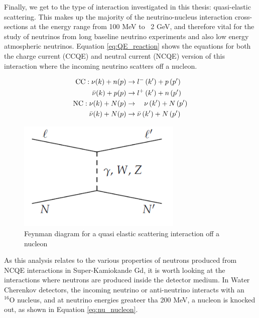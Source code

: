 Finally, we get to the type of interaction investigated in this thesis: quasi-elastic scattering. This makes up the majority of the neutrino-nucleus interaction cross-sections at the energy range from 100 MeV to ~2 GeV, and therefore vital for the study of neutrinos from long baseline neutrino experiments and also low energy atmospheric neutrinos. Equation \ref{eq:QE_reaction} shows the equations for both the charge current (CCQE) and neutral current (NCQE) version of this interaction where the incoming neutrino scatters off a nucleon.


\begin{align} 
\mathrm{CC}: \nu(k)+n(p) & \rightarrow l^{-}\left(k^{\prime}\right)+p\left(p^{\prime}\right) \label{eq:QE_reaction}\\
\bar{\nu}(k)+p(p) & \rightarrow l^{+}\left(k^{\prime}\right)+n\left(p^{\prime}\right) \notag\\
\mathrm{NC}: \nu(k)+N(p) & \rightarrow \quad \nu\left(k^{\prime}\right)+N\left(p^{\prime}\right) \notag \\
\bar{\nu}(k)+N(p) & \rightarrow \bar{\nu}\left(k^{\prime}\right)+N\left(p^{\prime}\right) \notag 
\end{align}



\begin{figure}
    \centering
    \includegraphics[width=0.7\textwidth]{Figures/QE_feynman.png}
    \caption{Feynman diagram for a quasi elastic scattering interaction off a nucleon}
    \label{fig:QE_reaction}
\end{figure}



As this analysis relates to the various properties of neutrons produced from NCQE interactions in Super-Kamiokande Gd, it is worth looking at the interactions where neutrons are produced inside the detector medium. In Water Cherenkov detectors, the incoming neutrino or anti-neutrino interacts with an ${ }^{16} \mathrm{O}$ nucleus, and at neutrino energies greateer tha 200 MeV, a nucleon is knocked out, as shown in Equation \ref{eq:nu_nucleon}.


